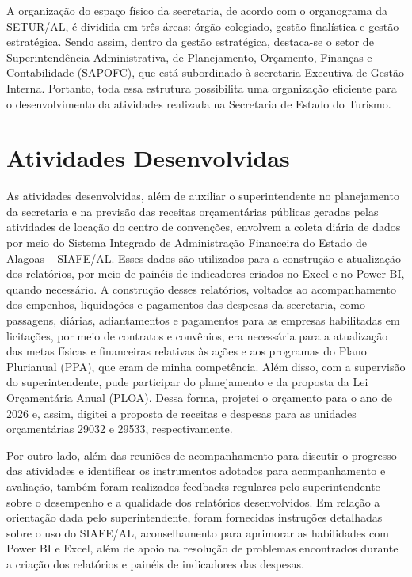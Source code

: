 \documentclass[12pt,a4paper]{article}
\begin{document}
	
	A organização do espaço físico da secretaria, de acordo com o organograma da SETUR/AL, é dividida em três áreas: órgão colegiado, gestão finalística e gestão estratégica. Sendo assim, dentro da gestão estratégica, destaca-se o setor de Superintendência Administrativa, de Planejamento, Orçamento, Finanças e Contabilidade (SAPOFC), que está subordinado à secretaria Executiva de Gestão Interna. Portanto, toda essa estrutura possibilita uma organização eficiente para o desenvolvimento da atividades realizada na Secretaria de Estado do Turismo.

	
	\section{Atividades Desenvolvidas}
	
	\hspace*{1,5cm} As atividades desenvolvidas, além de auxiliar o superintendente no planejamento da secretaria e na previsão das receitas orçamentárias públicas geradas pelas atividades de locação do centro de convenções, envolvem a coleta diária de dados por meio do Sistema Integrado de Administração Financeira do Estado de Alagoas – SIAFE/AL. Esses dados são utilizados para a construção e atualização dos relatórios, por meio de painéis de indicadores criados no Excel e no Power BI, quando necessário. A construção desses relatórios, voltados ao acompanhamento dos empenhos, liquidações e pagamentos das despesas da secretaria, como passagens, diárias, adiantamentos e pagamentos para as empresas habilitadas em licitações, por meio de contratos e convênios, era necessária para a atualização das metas físicas e financeiras relativas às ações e aos programas do Plano Plurianual (PPA), que eram de minha competência. Além disso, com a supervisão do superintendente, pude participar do planejamento e da proposta da Lei Orçamentária Anual (PLOA). Dessa forma, projetei o orçamento para o ano de 2026 e, assim, digitei a proposta de receitas e despesas para as unidades orçamentárias 29032 e 29533, respectivamente.
	
	Por outro lado, além das reuniões de acompanhamento para discutir o progresso das atividades e identificar os instrumentos 
	adotados para acompanhamento e avaliação, também foram realizados feedbacks regulares pelo superintendente sobre o desempenho e a 
	qualidade dos relatórios desenvolvidos. Em relação a orientação dada pelo superintendente, foram fornecidas instruções detalhadas sobre o uso do SIAFE/AL, 
	aconselhamento para aprimorar as habilidades com Power BI e Excel, além de apoio na resolução de problemas encontrados durante a criação dos relatórios e painéis de indicadores das despesas.  
	
\end{document}
